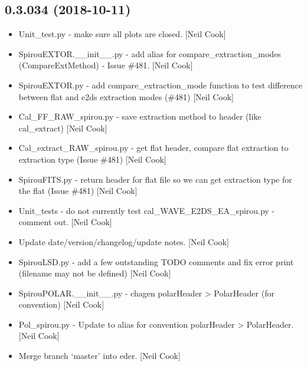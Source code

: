\documentclass[a4paper,10pt,english]{report}
\begin{document}
\subsection{0.3.034 (2018-10-11)}
\label{\detokenize{misc/changelog:id296}}\begin{itemize}
\item {} 
Unit\_test.py - make sure all plots are closed. {[}Neil Cook{]}

\item {} 
SpirouEXTOR.\_\_init\_\_.py - add alias for compare\_extraction\_modes
(CompareExtMethod) - Issue \#481. {[}Neil Cook{]}

\item {} 
SpirouEXTOR.py - add compare\_extraction\_mode function to test
difference between flat and e2ds extraction modes (\#481) {[}Neil Cook{]}

\item {} 
Cal\_FF\_RAW\_spirou.py - save extraction method to header (like
cal\_extract) {[}Neil Cook{]}

\item {} 
Cal\_extract\_RAW\_spirou.py - get flat header, compare flat extraction
to extraction type  (Issue \#481) {[}Neil Cook{]}

\item {} 
SpirouFITS.py - return header for flat file so we can get extraction
type for the flat (Issue \#481) {[}Neil Cook{]}

\item {} 
Unit\_tests - do not currently test cal\_WAVE\_E2DS\_EA\_spirou.py -
comment out. {[}Neil Cook{]}

\item {} 
Update date/version/changelog/update notes. {[}Neil Cook{]}

\item {} 
SpirouLSD.py - add a few outstanding TODO comments and fix error print
(filename may not be defined) {[}Neil Cook{]}

\item {} 
SpirouPOLAR.\_\_init\_\_.py - chagen polarHeader \textendash{}\textgreater{} PolarHeader (for
convention) {[}Neil Cook{]}

\item {} 
Pol\_spirou.py - Update to alias for convention polarHeader \textendash{}\textgreater{}
PolarHeader. {[}Neil Cook{]}

\item {} 
Merge branch ‘master’ into eder. {[}Neil Cook{]}


\end{itemize}
\end{document}
